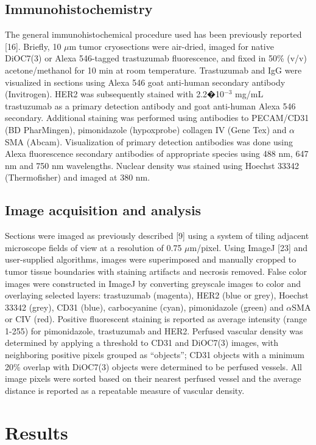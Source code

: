 \subsection{Immunohistochemistry}
The general immunohistochemical procedure used has been previously reported [16].
Briefly, 10 $\mu$m tumor cryosections were air-dried, imaged for native DiOC7(3) or Alexa 546-tagged trastuzumab fluorescence, and fixed in 50\% (v/v) acetone/methanol for 10 min at room temperature.
Trastuzumab and IgG were visualized in sections using Alexa 546 goat anti-human secondary antibody (Invitrogen).
HER2 was subsequently stained with 2.2�10$^{-3}$ mg/mL trastuzumab as a primary detection antibody and goat anti-human Alexa 546 secondary.
Additional staining was performed using antibodies to PECAM/CD31 (BD PharMingen), pimonidazole (hypoxprobe) collagen IV (Gene Tex) and $\alpha$SMA (Abcam).
Visualization of primary detection antibodies was done using Alexa fluorescence secondary antibodies of appropriate species using 488 nm, 647 nm and 750 nm wavelengths.
Nuclear density was stained using Hoechst 33342 (Thermofisher) and imaged at 380 nm.

\subsection{Image acquisition and analysis}
Sections were imaged as previously described [9] using a system of tiling adjacent microscope fields of view at a resolution of 0.75 $\mu$m/pixel.
Using ImageJ [23] and user-supplied algorithms, images were superimposed and manually cropped to tumor tissue boundaries with staining artifacts and necrosis removed.
False color images were constructed in ImageJ by converting greyscale images to color and overlaying selected layers: trastuzumab (magenta), HER2 (blue or grey), Hoechst 33342 (grey), CD31 (blue), carbocyanine (cyan), pimonidazole (green) and $\alpha$SMA or CIV (red).
Positive fluorescent staining is reported as average intensity (range 1-255) for pimonidazole, trastuzumab and HER2.
Perfused vascular density was determined by applying a threshold to CD31 and DiOC7(3) images, with neighboring positive pixels grouped as ``objects''; CD31 objects with a minimum 20\% overlap with DiOC7(3) objects were determined to be perfused vessels.
All image pixels were sorted based on their nearest perfused vessel and the average distance is reported as a repeatable measure of vascular density.

\section{Results}

